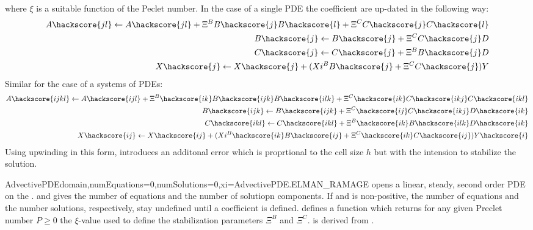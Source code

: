 where $\xi$ is a suitable function of the Peclet number.
In the case of a single PDE the coefficient are up-dated in the following way:
\begin{eqnarray}\label{LINEARPDE.ADVECTIVE.1}
A\hackscore{jl} \leftarrow A\hackscore{jl} + \Xi^{B} B\hackscore{j} B\hackscore{l} + \Xi^{C} C\hackscore{j} C\hackscore{l} \\
B\hackscore{j} \leftarrow B\hackscore{j} + \Xi^{C} C\hackscore{j} D \\
C\hackscore{j} \leftarrow C\hackscore{j} + \Xi^{B} B\hackscore{j} D \\
X\hackscore{j} \leftarrow X\hackscore{j} + (Xi^{B} B\hackscore{j} + \Xi^{C} C\hackscore{j}) Y \\
\end{eqnarray}
Similar for the case of a systems of PDEs:
\begin{eqnarray}\label{LINEARPDE.ADVECTIVE.SYSTEM}
A\hackscore{ijkl} \leftarrow A\hackscore{ijl} + \Xi^{B}\hackscore{ik} B\hackscore{ijk} B\hackscore{ilk} + 
                                                \Xi^{C}\hackscore{ik} C\hackscore{ikj} C\hackscore{ikl} \\
B\hackscore{ijk} \leftarrow B\hackscore{ijk} + \Xi^{C}\hackscore{ij} C\hackscore{ikj} D\hackscore{ik} \\
C\hackscore{ikl} \leftarrow C\hackscore{ikl} + \Xi^{B}\hackscore{ik} B\hackscore{ilk} D\hackscore{ik} \\
X\hackscore{ij} \leftarrow X\hackscore{ij} + (Xi^{B}\hackscore{ik} B\hackscore{ij} + \Xi^{C}\hackscore{ik} C\hackscore{ij}) Y\hackscore{i} \\
\end{eqnarray}
Using upwinding in this form, introduces an additonal error which is proprtional to the cell size $h$
but with the intension to stabilize the solution.

\begin{classdesc}{AdvectivePDE}{domain,numEquations=0,numSolutions=0,xi=AdvectivePDE.ELMAN_RAMAGE}
opens a linear, steady, second order PDE on the \Domain {}. 
and  gives the number of equations and the number of solutiopn components.
If  and  is non-positive, the number of equations 
and the number solutions, respectively, stay undefined until a coefficient is
defined.  defines a function which returns for any given  Preclet number $P\ge 0$ the 
$\xi$-value used to define the stabilization parameters $\Xi^{B}$ and $\Xi^{C}$.
\AdvectivePDE is derived from \LinearPDE.
\end{classdesc}

